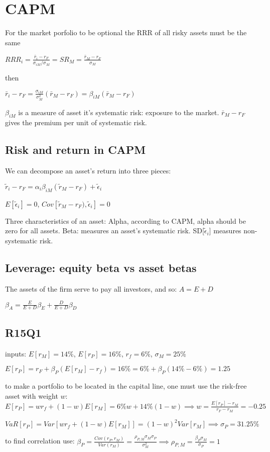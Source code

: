 \section{CAPM}

For the market porfolio to be optional the RRR of all risky assets must be the same

$RRR_i = \frac{\bar{r}_i-r_F}{\sigma_{iM}/ \sigma_M} = SR_M = \frac{\bar{r}_M-r_F}{\sigma_M}$

then

$ \bar{r}_i-r_F = \frac{\sigma_{iM}}{\sigma_M^2} (\bar{r}_M-r_F)  = \beta_{iM} (\bar{r}_M-r_F) $

$\beta_{iM}$ is a measure of asset it's systematic risk: exposure to the market.
$\bar{r}_M-r_F$ gives the premium per unit of systematic risk.

\subsection*{Risk and return in CAPM}
We can decompose an asset’s return into three pieces:


$ \tilde{r}_i-r_F = \alpha_i \beta_{iM} (\tilde{r}_M-r_F) + \tilde{\epsilon}_i$

$E[\tilde{\epsilon}_i]=0$, $Cov[\tilde{r}_M-r_F) , \tilde{\epsilon}_i]=0$

Three characteristics of an asset: Alpha, according to CAPM, alpha should be zero for all assets. Beta: measures an asset’s systematic risk. SD[$\tilde{\epsilon}_i$] measures non-systematic risk.

\subsection*{Leverage: equity beta vs asset betas}

The assets of the firm serve to pay all investors, and so:
$A=E+D$

$\beta_A = \frac{E}{E+D} \beta_E + \frac{D}{E+D} \beta_D$


\subsection*{R15Q1}
inputs: $E[r_M]=14\%$, $E[r_P]=16\%$, $r_f=6\%$, $\sigma_M=25\%$

$E[r_P] = r_F + \beta_P (E[r_M]-r_f) = 16\% = 6\% + \beta_P (14\% - 6\%) =1.25$

to make a portfolio to be located in the capital line, one must use the risk-free asset with weight $w$:
 $E[r_P]=w r_f + (1-w) E[r_M] = 6\%w+14\%(1-w) \implies w=\frac{E[r_P]-r_M}{r_F-r_M}=-0.25$
 
$VaR[r_P] = Var[w r_f + (1-w) E[r_M]] = (1-w)^2 Var[r_M] \implies \sigma_P = 31.25\% $ 

to find correlation use: 
$\beta_P = \frac{Cov(r_P, r_M)}{Var(r_M)}=\frac{\rho_{P,M} \sigma_M \sigma_P }{\sigma_M^2} \implies \rho_{P,M}=\frac{\beta_P \sigma_M}{\sigma_P} = 1$
